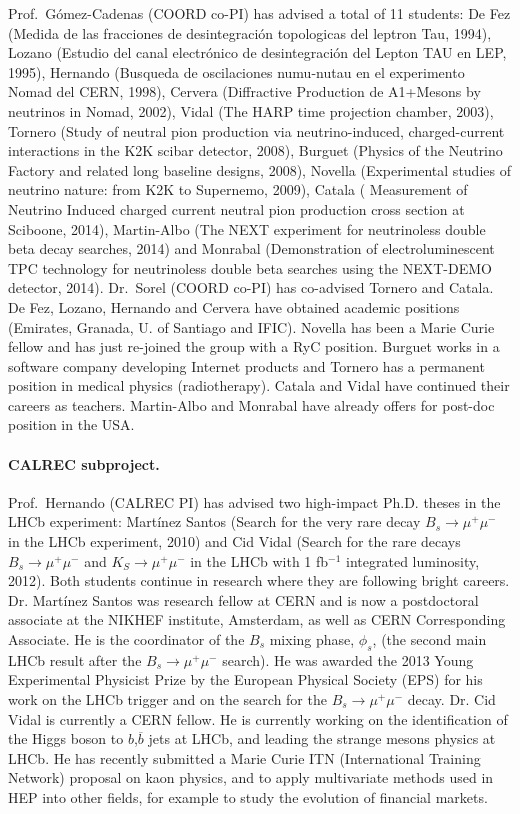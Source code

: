 Prof.~G\'omez-Cadenas (COORD co-PI) has advised a total of 11 students: De Fez (Medida de las fracciones de desintegración topologicas del leptron Tau, 1994), Lozano (Estudio del canal electrónico de desintegración del Lepton TAU en LEP, 1995), Hernando (Busqueda de oscilaciones numu-nutau en el experimento Nomad del CERN, 1998), Cervera (Diffractive Production de A1+Mesons by neutrinos in Nomad, 2002), Vidal (The HARP time projection chamber, 2003), Tornero (Study of neutral pion production via neutrino-induced, charged-current interactions in the K2K scibar detector, 2008), Burguet (Physics of the Neutrino Factory and related long baseline designs, 2008), Novella (Experimental studies of neutrino nature: from K2K to Supernemo, 2009), Catala ( Measurement of Neutrino Induced charged current neutral pion production cross section at Sciboone, 2014), Martin-Albo (The NEXT experiment for neutrinoless double beta decay searches, 2014) and Monrabal (Demonstration of electroluminescent TPC technology for neutrinoless double beta searches using the NEXT-DEMO detector, 2014). Dr.~Sorel (COORD co-PI) has co-advised Tornero and Catala. De Fez, Lozano, Hernando and Cervera have obtained academic positions (Emirates, Granada, U. of Santiago and IFIC). Novella has been a Marie Curie fellow and has just re-joined the group with a RyC position. Burguet works in a software company developing Internet products and Tornero has a permanent position in medical physics (radiotherapy). Catala and Vidal have continued their careers as teachers. Martin-Albo and Monrabal have already offers for post-doc position in the USA.

\paragraph{CALREC subproject.}

Prof.~Hernando (CALREC PI) has advised two high-impact Ph.D. theses in the LHCb experiment: Martínez Santos (Search for the very rare decay $B_s \to \mu^+\mu^-$ in the LHCb experiment, 2010) and Cid Vidal (Search for the rare decays $B_s \to \mu^+\mu^-$ and $K_S \to \mu^+\mu^-$ in the LHCb with 1 fb$^{-1}$ integrated luminosity, 2012). Both students continue in research where they are following bright careers. Dr. Mart\'inez Santos was research fellow at CERN and is now a postdoctoral associate at the NIKHEF institute, Amsterdam, as well as CERN Corresponding Associate. He is the coordinator of the $B_s$ mixing phase, $\phi_s$, (the second main LHCb result after the $B_s \to \mu^+\mu^-$ search). He was awarded the 2013 Young Experimental Physicist Prize by the European Physical Society (EPS) for his work on the LHCb trigger and on the search for the $B_s \to \mu^+ \mu^-$ decay. Dr. Cid Vidal is currently a CERN fellow. He is currently working on the identification of the Higgs boson to $b$,$\overline{b}$ jets at LHCb, and leading the strange mesons physics at LHCb. He has recently submitted a Marie Curie ITN  (International Training Network) proposal on kaon physics, and to apply multivariate methods used in HEP into other fields, for example to study the evolution of financial markets.
 

